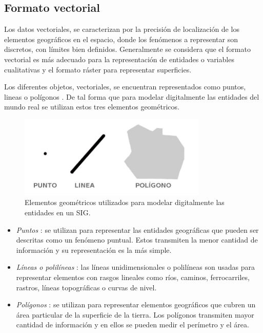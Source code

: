 \subsection{Formato vectorial}
Los datos vectoriales, se caracterizan por la precisión de localización de los elementos
geográficos en el espacio, donde los fenómenos a representar son discretos, con límites bien
definidos. Generalmente se considera que el formato vectorial es más adecuado para la
representación de entidades o variables cualitativas y el formato ráster para representar
superficies\cite{fAlonsoSig2006}.

Los diferentes objetos, vectoriales, se encuentran representados como puntos, lineas o polígonos
\cite{fAlonsoSig2006}. De tal forma que para modelar digitalmente las entidades del mundo real se
utilizan estos tres elementos geométricos.

\begin{figure}[!htbp]
\centering
\includegraphics[width=0.8\textwidth]{capitulo-2/graphics/dimensiones-datos.jpg}
\caption{\label{fig:sig-xyz} Elementos geométricos utilizados para modelar digitalmente las entidades en un SIG.}
\end{figure}

\begin{itemize}
    \item \textit{Puntos} : se utilizan para representar las entidades geográficas que pueden ser
    descritas como un fenómeno puntual. Estos transmiten la menor cantidad de información y su representación es la más simple.

    \item \textit{Líneas o polilíneas} : las líneas unidimensionales o polilíneas son usadas para
    representar elementos con rasgos lineales como ríos, caminos, ferrocarriles, rastros, líneas
    topográficas o curvas de nivel.

    \item \textit{Polígonos} : se utilizan para representar elementos geográficos que cubren un
    área particular de la superficie de la tierra. Los polígonos transmiten mayor cantidad de
    información y en ellos se pueden medir el perímetro y el área.
\end{itemize}

